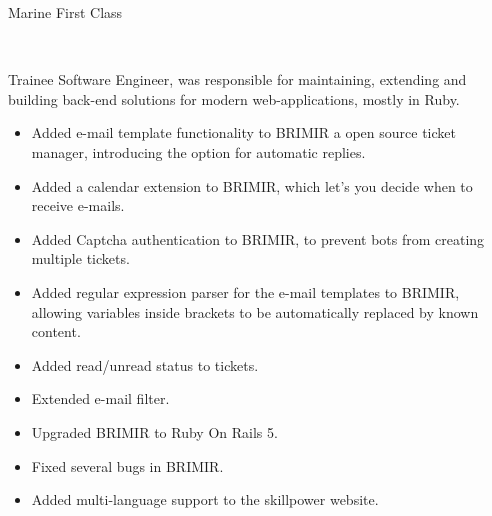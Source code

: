 \SmallSep


{Marine First Class}

\SmallSep


\Sep


~


{
  Trainee Software Engineer, was responsible for maintaining, extending and
  building back-end solutions for modern web-applications, mostly in Ruby.

  \SmallSep

  \begin{itemize}
    \item Added e-mail template functionality to BRIMIR a open source ticket
      manager, introducing the option for automatic replies.
    \item Added a calendar extension to BRIMIR, which let's you decide when
      to receive e-mails.
    \item Added Captcha authentication to BRIMIR, to prevent bots from creating
      multiple tickets.
    \item Added regular expression parser for the e-mail templates to BRIMIR,
      allowing variables inside brackets to be automatically replaced by known
      content.
    \item Added read/unread status to tickets.
    \item Extended e-mail filter.
    \item Upgraded BRIMIR to Ruby On Rails 5.
    \item Fixed several bugs in BRIMIR.
    \item Added multi-language support to the skillpower website.
  \end{itemize}

}

\SmallSep


